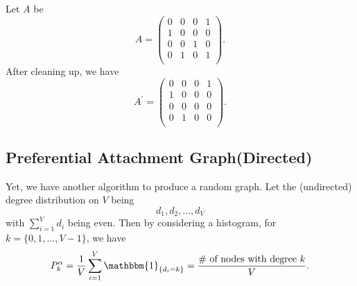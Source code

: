 \begin{remark}
\begin{itemize}
\begin{eg}
			      Let \(A\) be
			      \[
				      A = \begin{pmatrix}
					      0 & 0 & 0 & 1 \\
					      1 & 0 & 0 & 0 \\
					      0 & 0 & 1 & 0 \\
					      0 & 1 & 0 & 1 \\
				      \end{pmatrix}.
			      \]
			      After cleaning up, we have
			      \[
				      A^\prime = \begin{pmatrix}
					      0 & 0 & 0 & 1 \\
					      1 & 0 & 0 & 0 \\
					      0 & 0 & 0 & 0 \\
					      0 & 1 & 0 & 0 \\
				      \end{pmatrix}.
			      \]
		      \end{eg}
	\end{itemize}
\end{remark}

\subsection{Preferential Attachment Graph(Directed)}
Yet, we have another algorithm to produce a random graph. Let the (undirected) degree distribution on \(V\) being
\[
	d_1, d_2, \ldots , d_V
\]
with \(\sum\limits_{i=1}^{V} d_i\) being even. Then by considering a histogram, for \(k = \{0, 1, \ldots , V - 1\}\), we have
\[
	P_k^{\alpha} = \frac{1}{V}\sum\limits_{i=1}^{V} \mathbbm{1}_{\{d_i = k\}} = \frac{\#\text{ of nodes with degree }k}{V}.
\]

